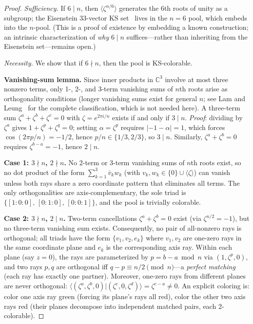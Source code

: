 \documentclass[12pt,a4paper]{article}
\newcommand{\C}{\mathbb{C}}
\begin{document}
\begin{proof}
\emph{Sufficiency.} If $6 \mid n$, then $\langle\zeta^{n/6}\rangle$ generates the 6th roots of unity as a subgroup; the Eisenstein 33-vector KS set~\cite{Cabello2025simplest} lives in the $n=6$ pool, which embeds into the $n$-pool.  (This is a proof of existence by embedding a known construction; an intrinsic characterization of \emph{why} $6 \mid n$ suffices---rather than inheriting from the Eisenstein set---remains open.)

\emph{Necessity.} We show that if $6 \nmid n$, then the pool is KS-colorable.

\textbf{Vanishing-sum lemma.}  Since inner products in $\C^3$ involve at most three nonzero terms, only 1-, 2-, and 3-term vanishing sums of $n$th roots arise as orthogonality conditions (longer vanishing sums exist for general $n$; see Lam and Leung~\cite{LamLeung2000} for the complete classification, which is not needed here).  A three-term sum $\zeta^a + \zeta^b + \zeta^c = 0$ with $\zeta = e^{2\pi i/n}$ exists if and only if $3 \mid n$.  \emph{Proof}: dividing by $\zeta^a$ gives $1 + \zeta^p + \zeta^q = 0$; setting $\alpha = \zeta^p$ requires $|-1-\alpha| = 1$, which forces $\cos(2\pi p/n) = -1/2$, hence $p/n \in \{1/3, 2/3\}$, so $3 \mid n$.  Similarly, $\zeta^a + \zeta^b = 0$ requires $\zeta^{b-a} = -1$, hence $2 \mid n$.

\textbf{Case 1: $3 \nmid n$, $2 \nmid n$.}  No 2-term or 3-term vanishing sums of $n$th roots exist, so no dot product of the form $\sum_{k=1}^{3} \bar{v}_k w_k$ (with $v_k, w_k \in \{0\} \cup \langle\zeta\rangle$) can vanish unless both rays share a zero coordinate pattern that eliminates all terms.  The only orthogonalities are axis-complementary, the sole triad is $\{[1{:}0{:}0],\, [0{:}1{:}0],\, [0{:}0{:}1]\}$, and the pool is trivially colorable.

\textbf{Case 2: $3 \nmid n$, $2 \mid n$.}  Two-term cancellations $\zeta^a + \zeta^b = 0$ exist (via $\zeta^{n/2} = -1$), but no three-term vanishing sum exists.  Consequently, no pair of all-nonzero rays is orthogonal; all triads have the form $\{v_1, v_2, e_k\}$ where $v_1, v_2$ are one-zero rays in the same coordinate plane and $e_k$ is the corresponding axis ray.  Within each plane (say $z = 0$), the rays are parameterized by $p = b - a \bmod n$ via $(1, \zeta^p, 0)$, and two rays $p, q$ are orthogonal iff $q - p \equiv n/2 \pmod{n}$---a \emph{perfect matching} (each ray has exactly one partner).  Moreover, one-zero rays from different planes are never orthogonal: $\langle(\zeta^a, \zeta^b, 0) | (\zeta^c, 0, \zeta^d)\rangle = \zeta^{c-a} \neq 0$.  An explicit coloring is: color one axis ray green (forcing its plane's rays all red), color the other two axis rays red (their planes decompose into independent matched pairs, each 2-colorable).


\end{proof}
\end{document}
